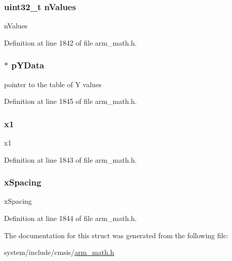 \subsubsection[{\texorpdfstring{n\+Values}{nValues}}]{\setlength{\rightskip}{0pt plus 5cm}uint32\+\_\+t n\+Values}\hypertarget{structarm__linear__interp__instance__f32_a2ea653b0599388e9a72ebab9841707ba}{}\label{structarm__linear__interp__instance__f32_a2ea653b0599388e9a72ebab9841707ba}
n\+Values 

Definition at line 1842 of file arm\+\_\+math.\+h.

\subsubsection[{\texorpdfstring{p\+Y\+Data}{pYData}}]{$\ast$ p\+Y\+Data}\hypertarget{structarm__linear__interp__instance__f32_af1489866b69eb5db1e0afeb24c7b01e9}{}\label{structarm__linear__interp__instance__f32_af1489866b69eb5db1e0afeb24c7b01e9}
pointer to the table of Y values 

Definition at line 1845 of file arm\+\_\+math.\+h.

\subsubsection[{\texorpdfstring{x1}{x1}}]{ x1}\hypertarget{structarm__linear__interp__instance__f32_a795ed79ea4c18d52afe5eb5e868e1c5a}{}\label{structarm__linear__interp__instance__f32_a795ed79ea4c18d52afe5eb5e868e1c5a}
x1 

Definition at line 1843 of file arm\+\_\+math.\+h.

\subsubsection[{\texorpdfstring{x\+Spacing}{xSpacing}}]{ x\+Spacing}\hypertarget{structarm__linear__interp__instance__f32_a08675584bb57fc42bbb3739c13674346}{}\label{structarm__linear__interp__instance__f32_a08675584bb57fc42bbb3739c13674346}
x\+Spacing 

Definition at line 1844 of file arm\+\_\+math.\+h.



The documentation for this struct was generated from the following file\+:\begin{DoxyCompactItemize}
\item 
system/include/cmsis/\hyperlink{arm__math_8h}{arm\+\_\+math.\+h}\end{DoxyCompactItemize}
